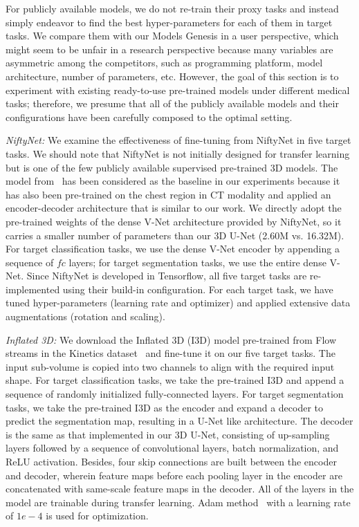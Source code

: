 For publicly available models, we do not re-train their proxy tasks and instead simply endeavor to find the best hyper-parameters for each of them in target tasks. We compare them with our Models Genesis in a user perspective, which might seem to be unfair in a research perspective because many variables are asymmetric among the competitors, such as programming platform, model architecture, number of parameters, etc. However, the goal of this section is to experiment with existing ready-to-use pre-trained models under different medical tasks; therefore, we presume that all of the publicly available models and their configurations have been carefully composed to the optimal setting.

\textit{NiftyNet:} We examine the effectiveness of fine-tuning from NiftyNet in five target tasks. We should note that NiftyNet is not initially designed for transfer learning but is one of the few publicly available supervised pre-trained 3D models. The model from~\citet{gibson2018automatic} has been considered as the baseline in our experiments because it has also been pre-trained on the chest region in CT modality and applied an encoder-decoder architecture that is similar to our work. We directly adopt the pre-trained weights of the dense V-Net architecture provided by NiftyNet, so it carries a smaller number of parameters than our 3D U-Net (2.60M vs. 16.32M). For target classification tasks, we use the dense V-Net encoder by appending a sequence of $fc$ layers; for target segmentation tasks, we use the entire dense V-Net. Since NiftyNet is developed in Tensorflow, all five target tasks are re-implemented using their build-in configuration. For each target task, we have tuned hyper-parameters (\eg learning rate and optimizer) and applied extensive data augmentations (\eg rotation and scaling).

\textit{Inflated 3D:} We download the Inflated 3D (I3D) model pre-trained from Flow streams in the Kinetics dataset~\citep{hara2018can} and fine-tune it on our five target tasks. The input sub-volume is copied into two channels to align with the required input shape. For target classification tasks, we take the pre-trained I3D and append a sequence of randomly initialized fully-connected layers. For target segmentation tasks, we take the pre-trained I3D as the encoder and expand a decoder to predict the segmentation map, resulting in a U-Net like architecture. The decoder is the same as that implemented in our 3D U-Net, consisting of up-sampling layers followed by a sequence of convolutional layers, batch normalization, and ReLU activation. Besides, four skip connections are built between the encoder and decoder, wherein feature maps before each pooling layer in the encoder are concatenated with same-scale feature maps in the decoder. All of the layers in the model are trainable during transfer learning. Adam method~\citep{kinga2015method} with a learning rate of $1e-4$ is used for optimization.

